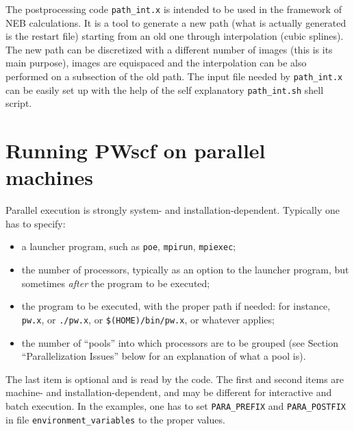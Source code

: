 \documentclass[12pt]{article}
\begin{document}
The postprocessing code {\tt path\_int.x} is intended to be used in the
framework of NEB calculations. It is a tool to generate a new path (what
is actually generated is the restart file) starting from an old one
through interpolation (cubic splines). The new path can be discretized
with a different number of images (this is its main purpose), images are
equispaced and the interpolation can be also performed on a subsection
of the old path. The input file needed by {\tt path\_int.x} can be easily
set up with the help of the self explanatory {\tt path\_int.sh} shell script.

\newpage

\section{Running PWscf on parallel machines}

Parallel execution is strongly system- and installation-dependent.
Typically one has to specify:
\begin{itemize}
\item a launcher program, such as {\tt poe}, {\tt mpirun}, {\tt mpiexec};
\item the number of processors, typically as an option to the launcher
      program, but sometimes {\em after} the program to be executed;
\item the program to be executed, with the proper path if needed:
      for instance, {\tt pw.x}, or {\tt ./pw.x}, or
      {\tt \$(HOME)/bin/pw.x}, or whatever applies;
\item the number of ``pools'' into which processors are to be grouped
     (see Section ``Parallelization Issues'' below for an explanation
      of what a pool is).
\end{itemize}
The last item is optional and is read by the code. The first and second
items are machine- and installation-dependent, and may be different
for interactive and batch execution. In the examples, one has to set
{\tt PARA\_PREFIX} and {\tt PARA\_POSTFIX} in file {\tt environment\_variables}
to the proper values.
\end{document}
